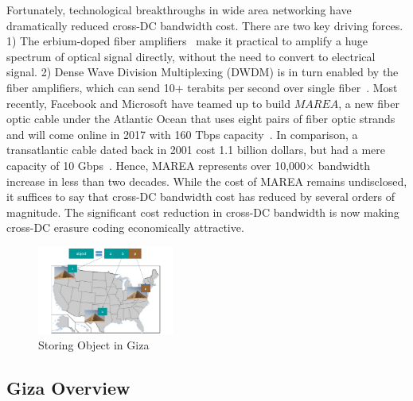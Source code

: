 Fortunately, technological breakthroughs in wide area networking have dramatically reduced cross-DC bandwidth cost.
There are two key driving forces. 1) The erbium-doped fiber
amplifiers~\cite{mears1986low} make it practical to amplify a huge spectrum of
optical signal directly, without the need to convert to electrical signal.
2) Dense Wave Division Multiplexing (DWDM) is in turn enabled by the fiber
amplifiers, which can send 10+ terabits per second over single fiber~\cite{zhu2011112}.
Most recently, Facebook and Microsoft have teamed up to build $MAREA$, a new
fiber optic cable under the Atlantic Ocean that uses eight pairs of fiber optic
strands and will come online in 2017 with 160 Tbps capacity~\cite{bib:MAREA1, bib:MAREA2}.
In comparison, a transatlantic cable dated back in 2001 cost 1.1 billion dollars,
but had a mere capacity of 10 Gbps~\cite{bib:FA-1}.
Hence, MAREA represents over 10,000$\times$ bandwidth increase in less than two decades.
While the cost of MAREA remains undisclosed, it suffices
to say that cross-DC bandwidth cost has reduced by several orders of magnitude.
The significant cost reduction in cross-DC bandwidth is now
making cross-DC erasure coding economically attractive.


\begin{figure}[tp]
\centering
\includegraphics[width=0.4\textwidth]{images/giza_example_crop_fit}
\caption{Storing Object in Giza}
\label{fig:giza_example}
\end{figure}

\subsection{Giza Overview}

